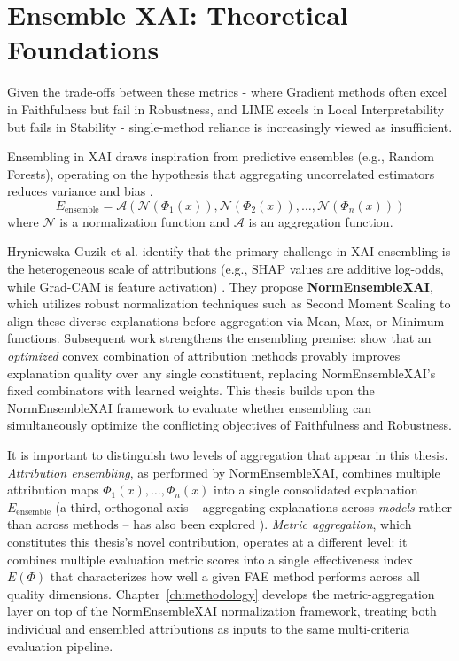 \section{Ensemble XAI: Theoretical Foundations}

Given the trade-offs between these metrics - where Gradient methods often excel in Faithfulness but fail in Robustness, and LIME excels in Local Interpretability but fails in Stability - single-method reliance is increasingly viewed as insufficient.

Ensembling in XAI draws inspiration from predictive ensembles (e.g., Random Forests), operating on the hypothesis that aggregating uncorrelated estimators reduces variance and bias \cite{hryniewska2024normensemblexai}.
\begin{equation}
    E_{\text{ensemble}} = \mathcal{A}(\mathcal{N}(\Phi_1(x)), \mathcal{N}(\Phi_2(x)), \dots, \mathcal{N}(\Phi_n(x)))
\end{equation}
where $\mathcal{N}$ is a normalization function and $\mathcal{A}$ is an aggregation function.

Hryniewska-Guzik et al. identify that the primary challenge in XAI ensembling is the heterogeneous scale of attributions (e.g., SHAP values are additive log-odds, while Grad-CAM is feature activation) \cite{hryniewska2024normensemblexai}. They propose \textbf{NormEnsembleXAI}, which utilizes robust normalization techniques such as Second Moment Scaling to align these diverse explanations before aggregation via Mean, Max, or Minimum functions. Subsequent work strengthens the ensembling premise: \citet{decker2024provably} show that an \emph{optimized} convex combination of attribution methods provably improves explanation quality over any single constituent, replacing NormEnsembleXAI's fixed combinators with learned weights. This thesis builds upon the NormEnsembleXAI framework to evaluate whether ensembling can simultaneously optimize the conflicting objectives of Faithfulness and Robustness.

It is important to distinguish two levels of aggregation that appear in this thesis. \emph{Attribution ensembling}, as performed by NormEnsembleXAI, combines multiple attribution maps $\Phi_1(x), \dots, \Phi_n(x)$ into a single consolidated explanation $E_{\text{ensemble}}$ (a third, orthogonal axis -- aggregating explanations across \emph{models} rather than across methods -- has also been explored \citep{vascotto2025multimodel}). \emph{Metric aggregation}, which constitutes this thesis's novel contribution, operates at a different level: it combines multiple evaluation metric scores into a single effectiveness index $E(\Phi)$ that characterizes how well a given FAE method performs across all quality dimensions. Chapter~\ref{ch:methodology} develops the metric-aggregation layer on top of the NormEnsembleXAI normalization framework, treating both individual and ensembled attributions as inputs to the same multi-criteria evaluation pipeline.

